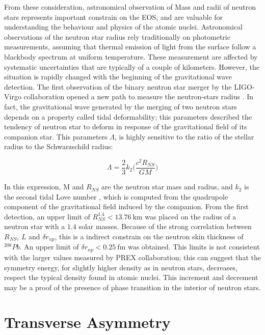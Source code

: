 From these consideration, astronomical observation of Mass and radii of neutron stars represents important constrain on the EOS, and are valuable for understanding the behaviour and physics of the atomic nuclei.
Astronomical observations of the neutron star radius rely traditionally on photometric measurements, assuming that thermal emission of light from the surface follow a blackbody spectrum at uniform temperature. These measurement are affected by systematic uncertainties that are typically of a couple of kilometers.
However, the situation is rapidly changed with the beginning of the gravitational wave detection. The first observation of the binary neutron star merger by the LIGO-Virgo collaboration opened a new path to measure the neutron-stars radius \cite{LIGOScientific:2017vwq}. In fact, the gravitational wave generated by the merging of two neutron stars depends on a property called tidal deformability; this parameters described the tendency of neutron star to deform in response of the gravitational field of its companion star. This parameters $\Lambda$, is highly sensitive to the ratio of the stellar radius to the Schwarzschild radius:

\begin{equation}
\Lambda = \frac{2}{3} k_{2} \bigl ( \dfrac{c^{2} R_{NS}}{GM} \bigl )
\end{equation}

In this expression, M and $R_{NS}$ are the neutron star mass and radius, and $k_{2}$ is the second tidal Love number \cite{Binnington:2009bb}, which is computed from the quadrupole component of the gravitational field induced by the companion. From the first detection, an upper limit of $R_{NS}^{1.4} < \SI{13.76}{\kilo \meter}$ was placed on the radius of a neutron star with a $1.4$ solar masses. Because of the strong correlation between $R_{NS}$, $L$ and $\delta r_{np}$, this is a indirect constrain on the neutron skin thickness of $^{208}Pb$. An upper limit of $\delta r_{np} < \SI{0.25}{\femto \meter}$ was obtained. This limits is not consistent with the larger values measured by PREX collaboration; this can suggest that the symmetry energy, for slightly higher density as in neutron stars, decreases, respect the typical density found in atomic nuclei. This increment and decrement may be a proof of the presence of phase transition in the interior of neutron stars.


\section{Transverse Asymmetry}

